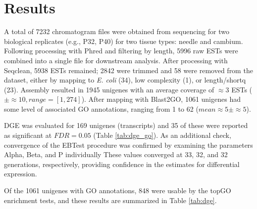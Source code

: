\documentclass[11pt]{article}
\begin{document}
\section*{Results}

A total of 7232 chromatogram files were obtained from sequencing for
two biological replicates (e.g., P32, P40) for two tissue types:
needle and cambium.  Following processing with Phred and filtering by
length, 5996 raw ESTs were combined into a single file for downstream
analysis.  After processing with Seqclean, 5938 ESTs remained; 2842
were trimmed and 58 were removed from the dataset, either by mapping
to \textit{E. coli} (34), low complexity (1), or length/shortq (23).
Assembly resulted in 1945 unigenes with an average coverage of
$\approx{3}$ ESTs ($\pm \approx{10}, range=[1,274]$). After mapping 
with Blast2GO, 1061 unigenes had some level of associated GO annotations, 
ranging from 1 to 62 ($mean \approx{5} \pm \approx{5}$).

DGE was evaluated for 169 unigenes (transcripts) and 35 of these were
reported as significant at $FDR = 0.05$ (Table \ref{tab:dge_go}). As an additional check,
convergence of the EBTest procedure was confirmed by examining the
parameters Alpha, Beta, and P individually These values converged at
33, 32, and 32 generations, respectively, providing confidence in the
estimates for differential expression.

Of the 1061 unigenes with GO annotations, 848 were usable by the 
topGO enrichment tests, and these results are summarized in Table \ref{tab:dge}.  
\end{document}
